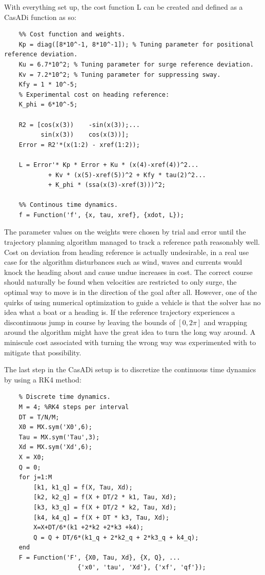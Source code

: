 With everything set up, the cost function L can be created and defined as a CasADi function as so:
\begin{lstlisting}
    %% Cost function and weights.
    Kp = diag([8*10^-1, 8*10^-1]); % Tuning parameter for positional reference deviation.
    Ku = 6.7*10^2; % Tuning parameter for surge reference deviation.
    Kv = 7.2*10^2; % Tuning parameter for suppressing sway.
    Kfy = 1 * 10^-5;
    % Experimental cost on heading reference:
    K_phi = 6*10^-5;

    R2 = [cos(x(3))    -sin(x(3));...
          sin(x(3))    cos(x(3))];
    Error = R2'*(x(1:2) - xref(1:2));

    L = Error'* Kp * Error + Ku * (x(4)-xref(4))^2...
            + Kv * (x(5)-xref(5))^2 + Kfy * tau(2)^2...
            + K_phi * (ssa(x(3)-xref(3)))^2;
    
    %% Continous time dynamics.
    f = Function('f', {x, tau, xref}, {xdot, L});    
\end{lstlisting}

The parameter values on the weights were chosen by trial and error until the trajectory planning algorithm managed
to track a reference path reasonably well. Cost on deviation from heading reference is actually undesirable, in a real use case
for the algorithm disturbances such as wind, waves and currents would knock the heading about and cause undue increases in cost.
The correct course should naturally be found when velocities are restricted to only
surge, the optimal way to move is in the direction of the goal after all. However, one of the quirks of using numerical optimization 
to guide a vehicle is that the solver has no idea what a boat or a heading is. If the reference trajectory experiences a discontinuous
jump in course by leaving the bounds of $[0, 2\pi]$ and wrapping around the algorithm might have the great idea to turn the long way around.
A miniscule cost associated with turning the wrong way was experimented with to mitigate that possibility.

The last step in the CasADi setup is to discretize the continuous time dynamics by using a \gls{RK4} method:
\begin{lstlisting}
    % Discrete time dynamics.
    M = 4; %RK4 steps per interval
    DT = T/N/M;
    X0 = MX.sym('X0',6);
    Tau = MX.sym('Tau',3);
    Xd = MX.sym('Xd',6);
    X = X0;
    Q = 0;
    for j=1:M
        [k1, k1_q] = f(X, Tau, Xd);
        [k2, k2_q] = f(X + DT/2 * k1, Tau, Xd);
        [k3, k3_q] = f(X + DT/2 * k2, Tau, Xd);
        [k4, k4_q] = f(X + DT * k3, Tau, Xd);
        X=X+DT/6*(k1 +2*k2 +2*k3 +k4);
        Q = Q + DT/6*(k1_q + 2*k2_q + 2*k3_q + k4_q);
    end
    F = Function('F', {X0, Tau, Xd}, {X, Q}, ... 
                    {'x0', 'tau', 'Xd'}, {'xf', 'qf'});
\end{lstlisting}

